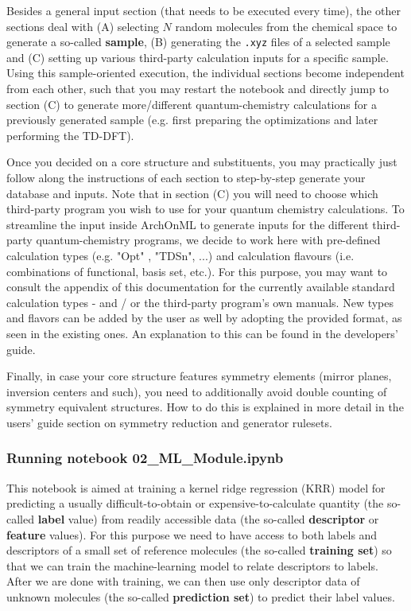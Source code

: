 \documentclass[12pt]{achemso}
\begin{document}
\noindent Besides a general input section (that needs to be executed every time), the other sections deal with (A) selecting $N$ random molecules from the chemical space to generate a so-called \textbf{sample}, (B) generating the \texttt{.xyz} files of a selected sample and (C) setting up various third-party calculation inputs for a specific sample. Using this sample-oriented execution, the individual sections become independent from each other, such that you may restart the notebook and directly jump to section (C) to generate more/different quantum-chemistry calculations for a previously generated sample (e.g. first preparing the optimizations and later performing the TD-DFT).

\noindent Once you decided on a core structure and substituents, you may practically just follow along the instructions of each section to step-by-step generate your database and inputs. Note that in section (C) you will need to choose which third-party program you wish to use for your quantum chemistry calculations. To streamline the input inside ArchOnML to generate inputs for the different third-party quantum-chemistry programs, we decide to work here with pre-defined calculation types (e.g. "Opt" , "TDSn", ...) and calculation flavours (i.e. combinations of functional, basis set, etc.). For this purpose, you may want to consult the appendix of this documentation for the currently available standard calculation types - and / or the third-party program's own manuals. New types and flavors can be added by the user as well by adopting the provided format, as seen in the existing ones. An explanation to this can be found in the developers' guide.

\noindent Finally, in case your core structure features symmetry elements (mirror planes, inversion centers and such), you need to additionally avoid double counting of symmetry equivalent structures. How to do this is explained in more detail in the users' guide section on symmetry reduction and generator rulesets.

\newpage

\subsubsection{Running notebook 02\_ML\_Module.ipynb}

\noindent This notebook is aimed at training a kernel ridge regression (KRR) model for predicting a usually difficult-to-obtain or expensive-to-calculate quantity (the so-called \textbf{label} value) from readily accessible data (the so-called \textbf{descriptor} or \textbf{feature} values). For this purpose we need to have access to both labels and descriptors of a small set of reference molecules (the so-called \textbf{training set}) so that we can train the machine-learning model to relate descriptors to labels. After we are done with training, we can then use only descriptor data of unknown molecules (the so-called \textbf{prediction set}) to predict their label values.
\end{document}
